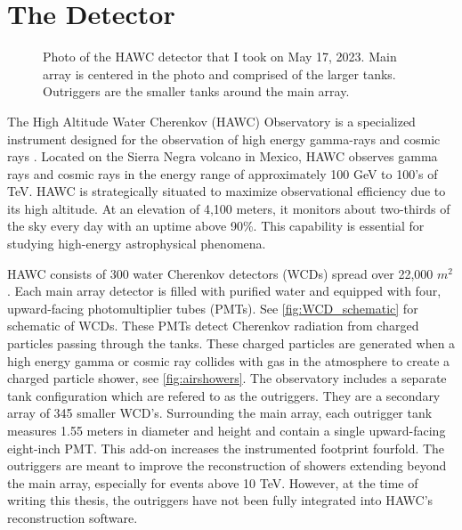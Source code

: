 \section{The Detector}\label{sec:THE_hawc}

\begin{figure}[h!]
    \caption{Photo of the HAWC detector that I took on May 17, 2023. Main array is centered in the photo and comprised of the larger tanks. Outriggers are the smaller tanks around the main array.}
    \label{fig:HAWC}
\end{figure}

The High Altitude Water Cherenkov (HAWC) Observatory is a specialized instrument designed for the observation of high energy gamma-rays and cosmic rays \cite{HAWC_NIM}.
Located on the Sierra Negra volcano in Mexico, HAWC observes gamma rays and cosmic rays in the energy range of approximately 100 GeV to 100's of TeV.
HAWC is strategically situated to maximize observational efficiency due to its high altitude.
At an elevation of 4,100 meters, it monitors about two-thirds of the sky every day with an uptime above 90\%.
This capability is essential for studying high-energy astrophysical phenomena.

HAWC consists of 300 water Cherenkov detectors (WCDs) spread over 22,000 $m^2$.
Each main array detector is filled with purified water and equipped with four, upward-facing photomultiplier tubes (PMTs).
See \cref{fig:WCD_schematic} for schematic of WCDs.
These PMTs detect Cherenkov radiation from charged particles passing through the tanks.
These charged particles are generated when a high energy gamma or cosmic ray collides with gas in the atmosphere to create a charged particle shower, see \cref{fig:airshowers}.
The observatory includes a separate tank configuration which are refered to as the outriggers.
They are a secondary array of 345 smaller WCD's.
Surrounding the main array, each outrigger tank measures 1.55 meters in diameter and height and contain a single upward-facing eight-inch PMT.
This add-on increases the instrumented footprint fourfold.
The outriggers are meant to improve the reconstruction of showers extending beyond the main array, especially for events above 10 TeV.
However, at the time of writing this thesis, the outriggers have not been fully integrated into HAWC's reconstruction software.

